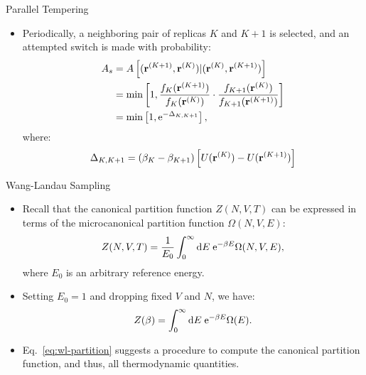 \documentclass[10pt]{beamer}
\begin{document}
\begin{frame}{Parallel Tempering}
\begin{itemize}
\setlength\itemsep{1em}
  \item Periodically, a neighboring pair of replicas $K$ and $K+1$ is selected, and an attempted switch is made with probability:
  \begin{align}
    A_s &= A\left[ ({\bf r}^{(K+1)}, {\bf r}^{(K)}) | ({\bf r}^{(K)}, {\bf r}^{(K+1)}) \right] \\
        &= \min\left[ 1, \frac{f_K({\bf r}^{(K+1)})}{f_K({\bf r}^{(K)})} \cdot \frac{f_{K+1}({\bf r}^{(K)})}{f_{K+1}({\bf r}^{(K+1)})} \right] \\
    &= \min\left[ 1, \mathrm{e}^{-\Delta_{K,K+1}} \right],
  \end{align}
  where:
  \begin{equation}
    \Delta_{K,K+1} = (\beta_K - \beta_{K+1}) \left[ U({\bf r}^{(K)}) - U({\bf r}^{(K+1)}) \right]
  \end{equation}
\end{itemize}
\end{frame}

\begin{frame}{Wang-Landau Sampling}
\begin{itemize}
\setlength\itemsep{1em}
  \item Recall that the canonical partition function $Z(N,V,T)$ can be expressed in terms of the microcanonical partition function $\Omega(N,V,E)$:
  \begin{equation}
    Z(N,V,T) = \frac{1}{E_0} \int_0^\infty \mathrm{d} E\; \mathrm{e}^{-\beta E} \Omega(N,V,E),
  \end{equation}
  where $E_0$ is an arbitrary reference energy.

  \item Setting $E_0=1$ and dropping fixed $V$ and $N$, we have:
  \begin{equation}
  \label{eq:wl-partition}
    Z(\beta) = \int_0^\infty \mathrm{d} E\; \mathrm{e}^{-\beta E}\Omega(E).
  \end{equation}

  \item Eq.~\ref{eq:wl-partition} suggests a procedure to compute the canonical partition function, and thus, all thermodynamic quantities.

  \end{itemize}
\end{frame}
\end{document}

